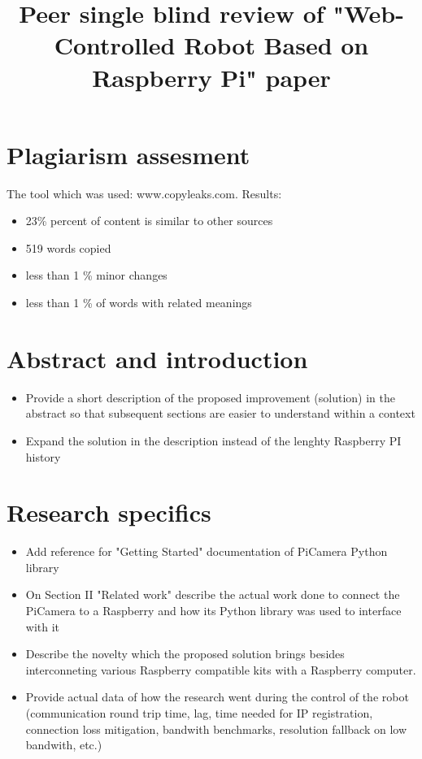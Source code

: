 \documentclass{article}
\begin{document}
\title{Peer single blind review of "Web-Controlled Robot Based on Raspberry Pi" paper}

\author{}

\maketitle

\section{Plagiarism assesment}

The tool which was used: www.copyleaks.com. Results:

\begin{itemize}

    \item 23\% percent of content is similar to other sources
    \item 519 words copied
    \item less than 1 \% minor changes
    \item less than 1 \% of words with related meanings

\end{itemize}

\section{Abstract and introduction}

\begin{itemize}

    \item Provide a short description of the proposed improvement (solution) in the abstract so that subsequent sections are easier to understand within a context
    \item Expand the solution in the description instead of the lenghty Raspberry PI history
    
\end{itemize}

\section{Research specifics}

\begin{itemize}
    
    \item Add reference for "Getting Started" documentation of PiCamera Python library
    \item On Section II "Related work" describe the actual work done to connect the PiCamera to a Raspberry and how its Python library was used to interface with it
    \item Describe the novelty which the proposed solution brings besides interconneting various Raspberry compatible kits with a Raspberry computer.
    \item Provide actual data of how the research went during the control of the robot (communication round trip time, lag, time needed for IP registration, connection loss mitigation, bandwith benchmarks, resolution fallback on low bandwith, etc.)

\end{itemize}
\end{document}
